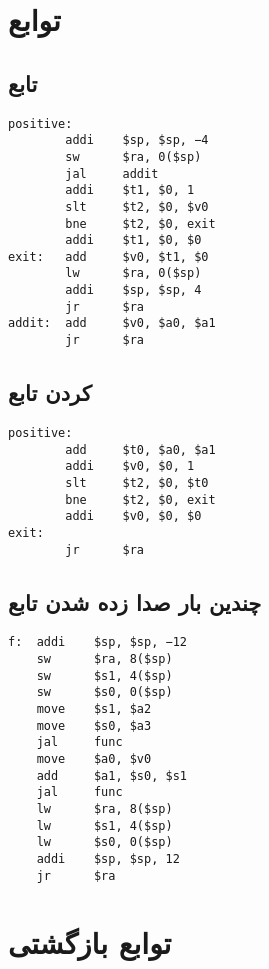 \documentclass[11pt, dvipsnames, svgnames, x11names]{article}
\begin{document}
\section{توابع}
\subsection{تابع }
\begin{latin}
\begin{lstlisting}[keywords={addi, sw, jal, slt, bne, add, lw, jr}]
positive:
        addi    $sp, $sp, −4
        sw      $ra, 0($sp)
        jal     addit
        addi    $t1, $0, 1
        slt     $t2, $0, $v0
        bne     $t2, $0, exit
        addi    $t1, $0, $0
exit:   add     $v0, $t1, $0
        lw      $ra, 0($sp)
        addi    $sp, $sp, 4
        jr      $ra
addit:  add     $v0, $a0, $a1
        jr      $ra
\end{lstlisting}
\end{latin}
\subsection{ کردن تابع}
\begin{latin}
\begin{lstlisting}[keywords={add, addi, slt, bne, jr}]
positive:
        add     $t0, $a0, $a1
        addi    $v0, $0, 1
        slt     $t2, $0, $t0
        bne     $t2, $0, exit
        addi    $v0, $0, $0
exit:
        jr      $ra
\end{lstlisting}
\end{latin}
\subsection{چندین بار صدا زده شدن تابع}
\begin{latin}
\begin{lstlisting}[keywords={addi, sw, move, jal, add, lw, jr}]
f:  addi    $sp, $sp, −12
    sw      $ra, 8($sp)
    sw      $s1, 4($sp)
    sw      $s0, 0($sp)
    move    $s1, $a2
    move    $s0, $a3
    jal     func
    move    $a0, $v0
    add     $a1, $s0, $s1
    jal     func
    lw      $ra, 8($sp)
    lw      $s1, 4($sp)
    lw      $s0, 0($sp)
    addi    $sp, $sp, 12
    jr      $ra
\end{lstlisting}
\end{latin}
\newpage
\section{توابع بازگشتی}
\end{document}
